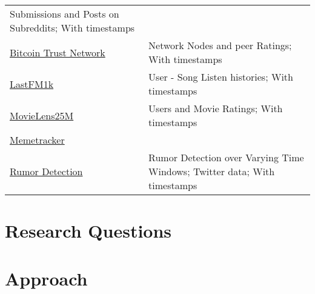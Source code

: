 \documentclass[
acmsmall,
nonacm,
screen,
acmthm]{../../scripts/pandoc/templates/acmart}
\makeatletter
\newcounter{tableno}
\newenvironment{tablenos:no-prefix-table-caption}{
  \caption@ifcompatibility{}{
    \let\oldthetable\thetable
    \let\oldtheHtable\theHtable
    \renewcommand{\thetable}{tableno:\thetableno}
    \renewcommand{\theHtable}{tableno:\thetableno}
    \stepcounter{tableno}
    \captionsetup{labelformat=empty}
  }
}{
  \caption@ifcompatibility{}{
    \captionsetup{labelformat=default}
    \let\thetable\oldthetable
    \let\theHtable\oldtheHtable
    \addtocounter{table}{-1}
  }
}
\makeatother
\begin{document}
\begin{tablenos:no-prefix-table-caption}
\begin{longtable}[]{@{}
  >{\raggedright\arraybackslash}p{}
  >{\raggedright\arraybackslash}p{}@{}}
Submissions and Posts on Subreddits; With timestamps \\
\href{https://snap.stanford.edu/data/soc-sign-bitcoin-otc.html}{Bitcoin
Trust Network} & Network Nodes and peer Ratings; With timestamps \\
\href{http://ocelma.net/MusicRecommendationDataset/lastfm-1K.html}{LastFM1k}
& User - Song Listen histories; With timestamps \\
\href{https://grouplens.org/datasets/movielens/25m/}{MovieLens25M} &
Users and Movie Ratings; With timestamps \\
\href{https://snap.stanford.edu/data/memetracker9.html}{Memetracker}
& \\
\href{https://journals.plos.org/plosone/article?id=10.1371/journal.pone.0168344}{Rumor
Detection} & Rumor Detection over Varying Time Windows; Twitter data;
With timestamps \\
\bottomrule
\end{longtable}

\end{tablenos:no-prefix-table-caption}

\hypertarget{research-questions}{%
\section{Research Questions}\label{research-questions}}

\hypertarget{approach}{%
\section{Approach}\label{approach}}

\renewcommand\refname{Planning}

\end{document}

